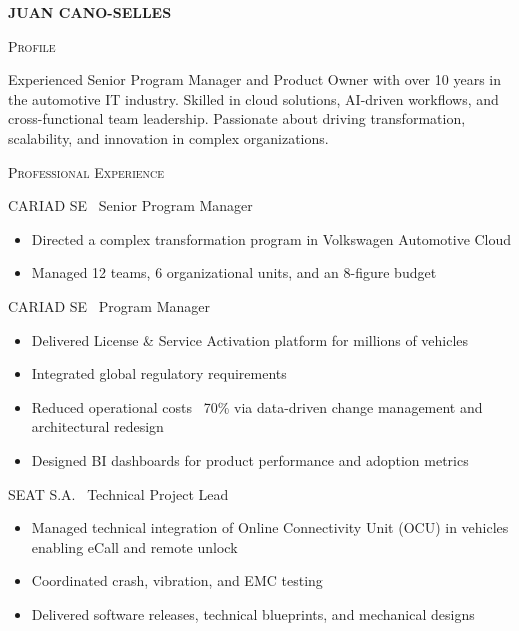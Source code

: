\documentclass[11pt, a4paper]{article}
\newcommand{\headright}[1]{\vspace*{2ex}\textsc{\large\color{cvblue}#1}\par%
  \vspace*{-1.4ex}{\color{cvblue}\hrulefill}\par}
\newlength{\SideBarW}
\newlength{\BetweenJobsGap}
\newenvironment{job}[3]{%
  \vspace{\BetweenJobsGap}%
  \noindent\textsc{#1} \textemdash\ #2\hfill
  \begin{itemize}[leftmargin=1.4em,label=--,labelsep=0.5em,itemsep=0.45ex,topsep=0.2ex]
}{%
  \end{itemize}%
}
\begin{document}
\begin{minipage}[t]{\dimexpr\textwidth-\SideBarW-3mm\relax}
  \setlength{\parskip}{0.8ex}
  \setlength{\leftskip}{4mm}
  \setlength{\rightskip}{6mm}

  \vspace*{6mm}
  {\fontsize{28}{30}\sffont\bfseries\MakeUppercase{\textcolor{cvblue}{Juan Cano-Selles}}}\par
  \vspace*{1.0ex}

  \headright{Profile}
  Experienced Senior Program Manager and Product Owner with over 10 years in the automotive IT industry. Skilled in cloud solutions, AI-driven workflows, and cross-functional team leadership. Passionate about driving transformation, scalability, and innovation in complex organizations.

  \headright{Professional Experience}

  \begin{job}{CARIAD SE}{Senior Program Manager}{Mar 2024 -- Sep 2025}
    \item Directed a complex transformation program in Volkswagen Automotive Cloud
    \item Managed 12 teams, 6 organizational units, and an 8-figure budget
  \end{job}

  \begin{job}{CARIAD SE}{Program Manager}{Nov 2020 -- Mar 2024}
    \item Delivered License \& Service Activation platform for millions of vehicles
    \item Integrated global regulatory requirements
    \item Reduced operational costs ~70\% via data-driven change management and architectural redesign
    \item Designed BI dashboards for product performance and adoption metrics
  \end{job}

  \begin{job}{SEAT S.A.}{Technical Project Lead}{Mar 2019 -- Nov 2020}
    \item Managed technical integration of Online Connectivity Unit (OCU) in vehicles enabling eCall and remote unlock
    \item Coordinated crash, vibration, and EMC testing
    \item Delivered software releases, technical blueprints, and mechanical designs
  \end{job}


\end{minipage}
\end{document}
